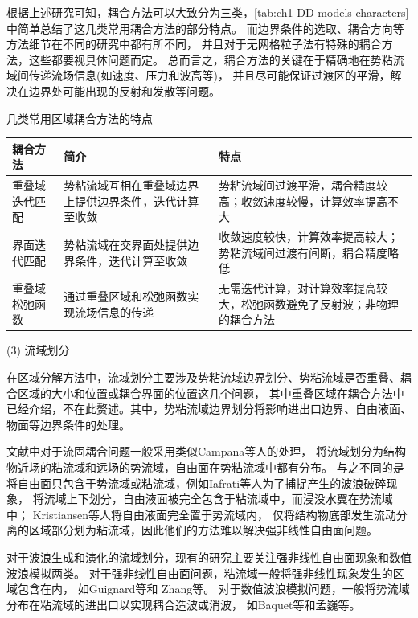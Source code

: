 根据上述研究可知，耦合方法可以大致分为三类，\cref{tab:ch1-DD-models-characters}中简单总结了这几类常用耦合方法的部分特点。%
而边界条件的选取、耦合方向等方法细节在不同的研究中都有所不同，%
并且对于无网格粒子法有特殊的耦合方法，这些都要视具体问题而定。%
总而言之，耦合方法的关键在于精确地在势粘流域间传递流场信息(如速度、压力和波高等)，%
并且尽可能保证过渡区的平滑，解决在边界处可能出现的反射和发散等问题。
\begin{mytable}
	\caption{几类常用区域耦合方法的特点}
	\label{tab:ch1-DD-models-characters}
	\begin{tabularx}{\textwidth}{M{3.1cm} X X}
		\toprule
		{耦合方法} & {\centering 简介} & {\centering 特点} \\
		\midrule
		{重叠域迭代匹配} & {势粘流域互相在重叠域边界上提供边界条件，迭代计算至收敛} %
		& {势粘流域间过渡平滑，耦合精度较高；收敛速度较慢，计算效率提高不大} \\
		{界面迭代匹配} & {势粘流域在交界面处提供边界条件，迭代计算至收敛} %
		& {收敛速度较快，计算效率提高较大；势粘流域间过渡有间断，耦合精度略低}\\
		{重叠域松弛函数} & {通过重叠区域和松弛函数实现流场信息的传递} %
		& {无需迭代计算，对计算效率提高较大，松弛函数避免了反射波；非物理的耦合方法} \\
		\bottomrule
	\end{tabularx}
\end{mytable}

(3) 流域划分

在区域分解方法中，流域划分主要涉及势粘流域边界划分、势粘流域是否重叠、耦合区域的大小和位置或耦合界面的位置这几个问题，%
其中重叠区域在耦合方法中已经介绍，不在此赘述。其中，势粘流域边界划分将影响进出口边界、自由液面、物面等边界条件的处理。%

文献中对于流固耦合问题一般采用类似Campana等人\cite{campanaDomainDecompositionFree1994}的处理，%
将流域划分为结构物近场的粘流域和远场的势流域，自由面在势粘流域中都有分布。%
与之不同的是将自由面只包含于势流域或粘流域，例如Iafrati等人\cite{iafratiDomainDecompositionApproach2003}为了捕捉产生的波浪破碎现象，%
将流域上下划分，自由液面被完全包含于粘流域中，而浸没水翼在势流域中；%
Kristiansen等人\cite{kristiansenGapResonanceAnalyzed2012}将自由液面完全置于势流域内，%
仅将结构物底部发生流动分离的区域部分划为粘流域，因此他们的方法难以解决强非线性自由面问题。%

对于波浪生成和演化的流域划分，现有的研究主要关注强非线性自由面现象和数值波浪模拟两类。%
对于强非线性自由面问题，粘流域一般将强非线性现象发生的区域包含在内，%
如Guignard等\cite{guignardComputationShoalingBreaking1999}和%
Zhang等\cite{zhangCouplingViscousPotential2013,zhangSolitaryWaveBreaking2015}。%
对于数值波浪模拟问题，一般将势流域分布在粘流域的进出口以实现耦合造波或消波，%
如Baquet等\cite{baquetNumericalModelingUsing2017}和孟巍等\cite{孟JiYuShuangXiangShiLiuNianLiuOuHeDeShuZhiXiaoBoMoNi2022}。%

